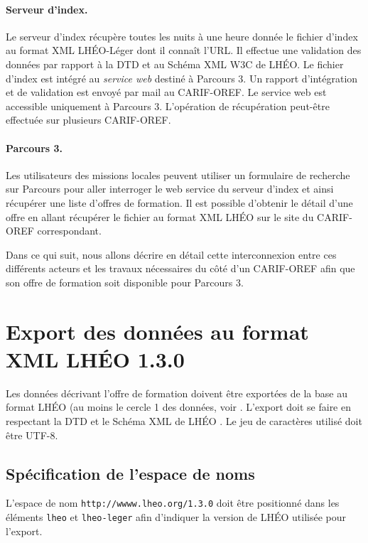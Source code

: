 \documentclass[a4paper]{report}
\begin{document}
\paragraph{Serveur d'index.} Le serveur d'index récupère toutes les
nuits à une heure donnée le fichier d'index au format XML LHÉO-Léger
dont il connaît l'URL.  Il effectue une validation des données par
rapport à la DTD \cite{DTD-LHEO} et au Schéma XML W3C \cite{XSD-LHEO}
de LHÉO. Le fichier d'index est intégré au \emph{service web} destiné
à Parcours 3. Un rapport d'intégration et de validation est envoyé par
mail au CARIF-OREF.  Le service web est accessible uniquement à
Parcours 3.  L'opération de récupération peut-être effectuée sur
plusieurs CARIF-OREF.

\paragraph{Parcours 3.} Les utilisateurs des missions locales peuvent
utiliser un formulaire de recherche sur Parcours pour aller interroger
le web service du serveur d'index et ainsi récupérer une liste
d'offres de formation. Il est possible d'obtenir le détail d'une offre
en allant récupérer le fichier au format XML LHÉO sur le site du
CARIF-OREF correspondant.

Dans ce qui suit, nous allons décrire en détail cette interconnexion
entre ces différents acteurs et les travaux nécessaires du côté d'un
CARIF-OREF afin que son offre de formation soit disponible pour
Parcours 3.


\section{Export des données au format XML LHÉO 1.3.0}

Les données décrivant l'offre de formation doivent être exportées de
la base au format LHÉO (au moins le cercle 1 des données, voir
\cite{WEB-LHEO,MANUEL-LHEO}.  L'export doit se faire en respectant la
DTD et le Schéma XML de LHÉO \cite{DTD-LHEO,XSD-LHEO}. Le jeu de
caractères utilisé doit être UTF-8.

\subsection{Spécification de l'espace de noms}

L'espace de nom \texttt{http://wwww.lheo.org/1.3.0} doit être
positionné dans les éléments \texttt{lheo} et \texttt{lheo-leger} afin
d'indiquer la version de LHÉO utilisée pour l'export.
\end{document}
